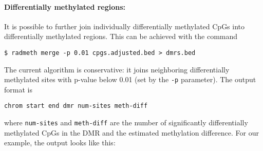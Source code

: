 \documentclass[10pt]{article}
\begin{document}
\paragraph{Differentially methylated regions:} It is possible to further join 
individually differentially methylated CpGs into differentially methylated 
regions. This can be achieved with the command
{\small{%
\begin{verbatim}
$ radmeth merge -p 0.01 cpgs.adjusted.bed > dmrs.bed
\end{verbatim}%
}}

The current algorithm is conservative: it joins neighboring differentially
methylated sites with p-value below 0.01 (set by the {\tt -p} parameter). 
The output format is
{\small{%
\begin{verbatim}
chrom start end dmr num-sites meth-diff
\end{verbatim}%
}}
\noindent where {\tt num-sites} and {\tt meth-diff} are the number of 
significantly differentially methylated CpGs in the DMR and the estimated 
methylation difference. For our example, the output looks like this:
\end{document}
